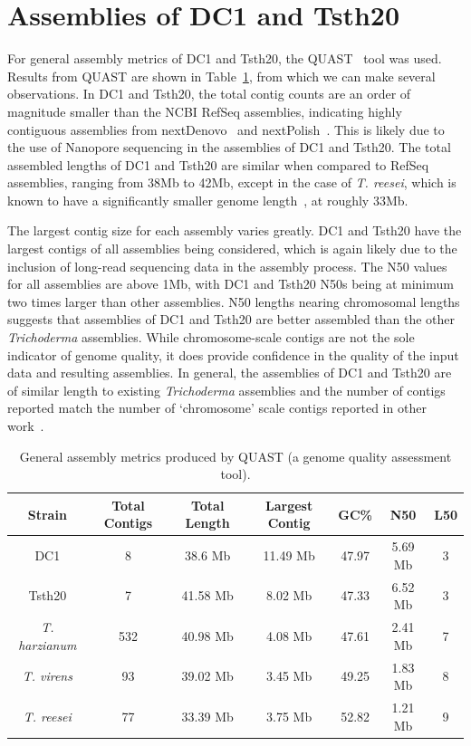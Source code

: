\section{Assemblies of DC1 and Tsth20}\label{section:assemblies}

For general assembly metrics of DC1 and Tsth20, the
QUAST~\cite{gurevich2013b} tool was used. Results from QUAST are shown
in Table~\ref{table:assemblies}, from which we can make several
observations. In DC1 and Tsth20, the total contig counts are an order
of magnitude smaller than the NCBI RefSeq
assemblies, indicating highly contiguous assemblies from
nextDenovo~\cite{hu2024a} and nextPolish~\cite{hu2024a}. This is likely
due to the use of Nanopore sequencing in the assemblies of DC1 and
Tsth20. The total assembled lengths of DC1 and Tsth20 are similar when
compared to RefSeq assemblies, ranging from 38Mb to 42Mb, except in
the case of \textit{T. reesei}, which is known to have a significantly
smaller genome length~\cite{kubicek2019a}, at roughly 33Mb.

The largest contig size for each assembly varies greatly. DC1 and
Tsth20 have the largest contigs of all assemblies being considered,
which is again likely due to the inclusion of long-read sequencing
data in the assembly process. The N50 values for all assemblies are
above 1Mb, with DC1 and Tsth20 N50s being at minimum two times larger
than other assemblies. N50 lengths nearing chromosomal lengths
suggests that assemblies of DC1 and Tsth20 are better assembled than
the other \textit{Trichoderma} assemblies. While chromosome-scale
contigs are not the sole indicator of genome quality, it does provide
confidence in the quality of the input data and resulting
assemblies. In general, the assemblies of DC1 and Tsth20 are of
similar length to existing \textit{Trichoderma} assemblies and the
number of contigs reported match the number of `chromosome' scale
contigs reported in other work~\cite{kubicek2019a}.

\begin{table}
  \begin{center}
    \begin{tabular}{|c|c|c|c|c|c|c|}
      \hline
      Strain & Total Contigs & Total Length & Largest Contig & GC\% & N50 & L50 \\ \hline
      DC1 & 8 & 38.6 Mb & 11.49 Mb & 47.97 & 5.69 Mb & 3 \\ \hline
      Tsth20 & 7 & 41.58 Mb & 8.02 Mb & 47.33 & 6.52 Mb & 3 \\ \hline
      \textit{T. harzianum} & 532 & 40.98 Mb & 4.08 Mb & 47.61 & 2.41 Mb & 7 \\ \hline
      \textit{T. virens} & 93 & 39.02 Mb & 3.45 Mb & 49.25 & 1.83 Mb & 8 \\ \hline
      \textit{T. reesei} & 77 & 33.39 Mb & 3.75 Mb & 52.82 & 1.21 Mb & 9 \\ \hline
    \end{tabular}
  \end{center}
  \caption[General assembly metrics produced by QUAST]{General assembly metrics produced by
    QUAST\cite{gurevich2013b} (a genome quality assessment tool).}\label{table:assemblies}
\end{table}

